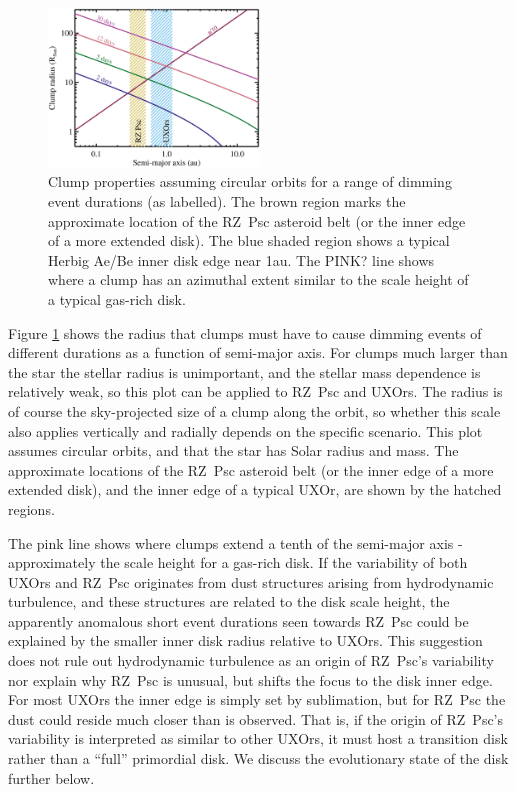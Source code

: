 \documentclass[]{rsos}
\begin{document}
\begin{figure}
  \begin{center}
    \hspace{-0.5cm} \includegraphics[width=0.5\textwidth]{figs/rcl-a.eps}
    \caption{Clump properties assuming circular orbits for a range of dimming event
      durations (as labelled). The brown region marks the approximate location of the
      RZ~Psc asteroid belt (or the inner edge of a more extended disk). The blue shaded
      region shows a typical Herbig Ae/Be inner disk edge near 1au. The PINK? line shows
      where a clump has an azimuthal extent similar to the scale height of a typical
      gas-rich disk.}\label{fig:rcla}
  \end{center}
\end{figure}

Figure \ref{fig:rcla} shows the radius that clumps must have to cause dimming events of
different durations as a function of semi-major axis. For clumps much larger than the
star the stellar radius is unimportant, and the stellar mass dependence is relatively
weak, so this plot can be applied to RZ~Psc and UXOrs. The radius is of course the
sky-projected size of a clump along the orbit, so whether this scale also applies
vertically and radially depends on the specific scenario. This plot assumes circular
orbits, and that the star has Solar radius and mass. The approximate locations of the
RZ~Psc asteroid belt (or the inner edge of a more extended disk), and the inner edge of a
typical UXOr, are shown by the hatched regions.

The pink line shows where clumps extend a tenth of the semi-major axis - approximately
the scale height for a gas-rich disk. If the variability of both UXOrs and RZ~Psc
originates from dust structures arising from hydrodynamic turbulence, and these
structures are related to the disk scale height, the apparently anomalous short event
durations seen towards RZ~Psc could be explained by the smaller inner disk radius
relative to UXOrs. This suggestion does not rule out hydrodynamic turbulence as an origin
of RZ~Psc's variability nor explain why RZ~Psc is unusual, but shifts the focus to the
disk inner edge. For most UXOrs the inner edge is simply set by sublimation, but for
RZ~Psc the dust could reside much closer than is observed. That is, if the origin of
RZ~Psc's variability is interpreted as similar to other UXOrs, it must host a transition
disk rather than a ``full'' primordial disk. We discuss the evolutionary state of the
disk further below.
\end{document}
